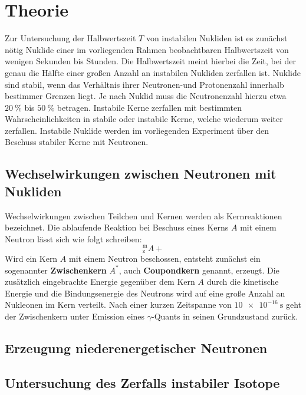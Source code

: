 \section{Theorie}
\label{sec:Theorie}
Zur Untersuchung der Halbwertszeit $T$ von instabilen Nukliden ist es zunächst nötig
Nuklide einer im vorliegenden Rahmen beobachtbaren Halbwertszeit von wenigen Sekunden bis Stunden. Die Halbwertszeit meint hierbei die Zeit, bei der genau die Hälfte einer großen Anzahl an instabilen Nukliden zerfallen ist.
Nuklide sind stabil, wenn das Verhältnis ihrer Neutronen-und Protonenzahl innerhalb bestimmer Grenzen liegt.
Je nach Nuklid muss die Neutronenzahl hierzu etwa $\SI{20}{\percent}$ bis $\SI{50}{\percent}$ betragen. Instabile Kerne zerfallen mit bestimmten Wahrscheinlichkeiten in stabile oder instabile Kerne, welche wiederum weiter zerfallen.
Instabile Nuklide werden im vorliegenden Experiment über den Beschuss stabiler Kerne mit Neutronen.
\subsection{Wechselwirkungen zwischen Neutronen mit Nukliden}
Wechselwirkungen zwischen Teilchen und Kernen werden als Kernreaktionen bezeichnet.
Die ablaufende Reaktion bei Beschuss eines Kerns $A$ mit einem Neutron lässt sich wie folgt schreiben:
\begin{equation*}
  ^{\mathrm{m}}_\mathrm{z}A+
\end{equation*}
Wird ein Kern $A$ mit einem Neutron beschossen, entsteht zunächst ein sogenannter \textbf{Zwischenkern} $A^{*}$, auch \textbf{Coupondkern} genannt, erzeugt. Die zusätzlich eingebrachte Energie gegenüber dem Kern $A$ durch die kinetische Energie und die Bindungsenergie des Neutrons wird auf eine große Anzahl an Nukleonen im Kern verteilt.
Nach einer kurzen Zeitspanne von $\SI{10e-16}{\second}$ geht der Zwischenkern unter Emission eines $\gamma$-Quants in seinen Grundzustand zurück.
\subsection{Erzeugung niederenergetischer Neutronen}



\subsection{Untersuchung des Zerfalls instabiler Isotope}
